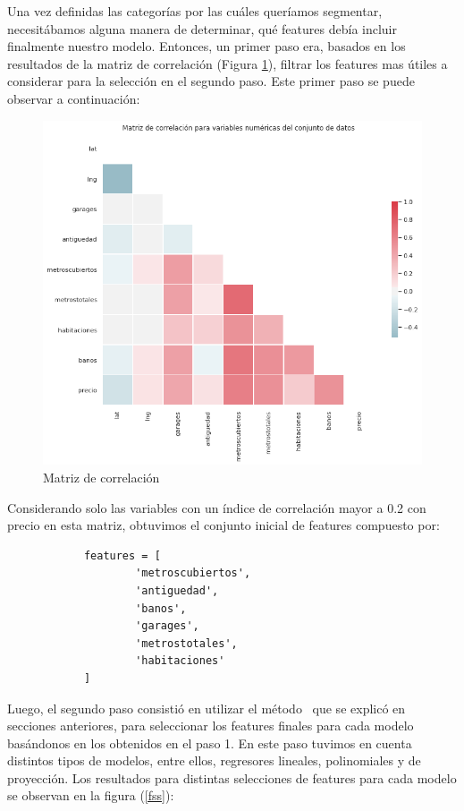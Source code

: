     Una vez definidas las categorías por las cuáles queríamos segmentar, necesitábamos alguna manera de determinar, qué features debía incluir finalmente nuestro modelo. Entonces, un primer paso era, basados en los resultados de la matriz de correlación (Figura \ref{corr}), filtrar los features mas útiles a considerar para la selección en el segundo paso. Este primer paso se puede observar a continuación:
    \begin{figure}[H]
        \centering
        \includegraphics[scale=0.5]{img/cmp/1_corr.png}
        \caption{Matriz de correlación}
        \label{corr}
    \end{figure}
    
    Considerando solo las variables con un índice de correlación mayor a 0.2 con precio en esta matriz, obtuvimos el conjunto inicial de features compuesto por:
    

        \begin{verbatim}
            features = [
                    'metroscubiertos',
                    'antiguedad',
                    'banos',
                    'garages',
                    'metrostotales',
                    'habitaciones'
            ]
        \end{verbatim}
    
    Luego, el segundo paso consistió en utilizar el método \fss \ que se explicó en secciones anteriores, para seleccionar los features finales para cada modelo basándonos en los obtenidos en el paso 1. En este paso tuvimos en cuenta distintos tipos de modelos, entre ellos, regresores lineales, polinomiales y de proyección. Los resultados para distintas selecciones de features para cada modelo se observan en la figura (\ref{fss}):
     

